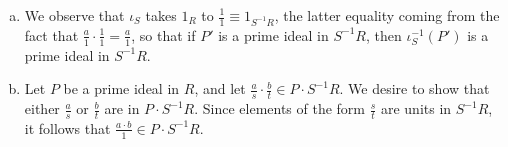 \documentclass[10pt]{mypackage}
\begin{document}
\begin{solution}\hfill
  \begin{enumerate}[(a)]
    \item We observe that $\iota_S$ takes $1_{R}$ to $\frac{1}{1}\equiv 1_{S^{-1}R}$, the latter equality coming from the fact that $ \frac{a}{1} \cdot \frac{1}{1} = \frac{a}{1} $, so that if $P'$ is a prime ideal in $S^{-1}R$, then $\iota_S^{-1}\left( P' \right)$ is a prime ideal in $S^{-1}R$.
    \item Let $P$ be a prime ideal in $R$, and let $\frac{a}{s}\cdot\frac{b}{t}\in P\cdot S^{-1}R$. We desire to show that either $ \frac{a}{s} $ or $ \frac{b}{t} $ are in $P\cdot S^{-1}R$. Since elements of the form $\frac{s}{t}$ are units in $ S^{-1}R $, it follows that $ \frac{a\cdot b}{1}\in P\cdot S^{-1}R $. 
  \end{enumerate}
\end{solution}
\end{document}
